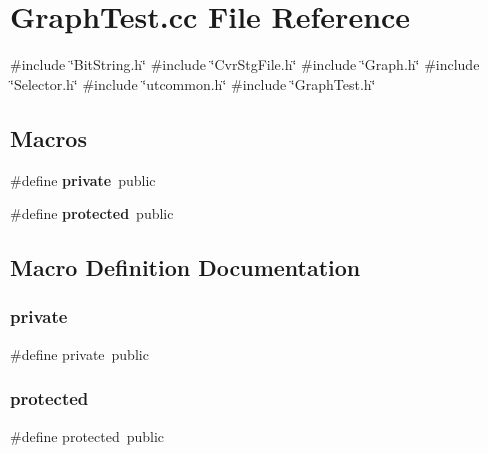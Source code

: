 \section{Graph\+Test.\+cc File Reference}
\label{GraphTest_8cc}
{\ttfamily \#include \char`\"{}Bit\+String.\+h\char`\"{}}\newline
{\ttfamily \#include \char`\"{}Cvr\+Stg\+File.\+h\char`\"{}}\newline
{\ttfamily \#include \char`\"{}Graph.\+h\char`\"{}}\newline
{\ttfamily \#include \char`\"{}Selector.\+h\char`\"{}}\newline
{\ttfamily \#include \char`\"{}utcommon.\+h\char`\"{}}\newline
{\ttfamily \#include \char`\"{}Graph\+Test.\+h\char`\"{}}\newline
\subsection*{Macros}
\begin{DoxyCompactItemize}
\item 
\#define \textbf{ private}~public
\item 
\#define \textbf{ protected}~public
\end{DoxyCompactItemize}


\subsection{Macro Definition Documentation}
\mbox{\label{GraphTest_8cc_a6a1d6e1a12975a4e9a0b5b952e79eaad}} 
\subsubsection{private}
{\footnotesize\ttfamily \#define private~public}

\mbox{\label{GraphTest_8cc_a363c8dcebb1777654ad1703136a14ec8}} 
\subsubsection{protected}
{\footnotesize\ttfamily \#define protected~public}

